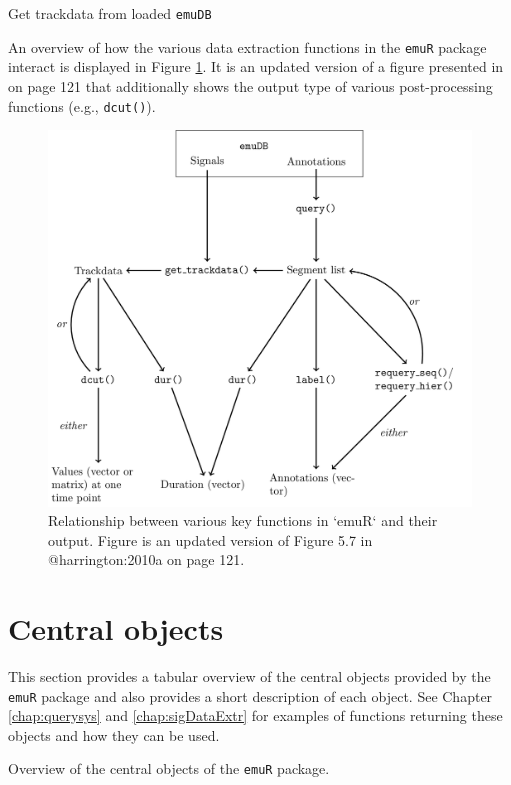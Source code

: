 \documentclass[]{book}
\theoremstyle{definition}
\theoremstyle{definition}
\theoremstyle{definition}
\theoremstyle{remark}
\begin{document}
Get trackdata from loaded \texttt{emuDB}

An overview of how the various data extraction functions in the
\texttt{emuR} package interact is displayed in Figure
\ref{fig:emuRpackageDetails-dataExtrRel}. It is an updated version of a
figure presented in \citet{harrington:2010a} on page 121 that
additionally shows the output type of various post-processing functions
(e.g., \texttt{dcut()}).

\begin{figure}

{\centering \includegraphics[width=0.75\linewidth]{pics/keyFuncsRel} 

}

\caption{Relationship between various key functions in `emuR` and their output. Figure is an updated version of Figure 5.7 in @harrington:2010a on page 121.}\label{fig:emuRpackageDetails-dataExtrRel}
\end{figure}

\hypertarget{sec:emuRpackageDetails-centralObjects}{%
\section{Central objects}\label{sec:emuRpackageDetails-centralObjects}}

This section provides a tabular overview of the central objects provided
by the \texttt{emuR} package and also provides a short description of
each object. See Chapter \ref{chap:querysys} and \ref{chap:sigDataExtr}
for examples of functions returning these objects and how they can be
used.

\label{tab:emuRpackageDetails-centralObjects}Overview of the central objects
of the \texttt{emuR} package.
\end{document}
